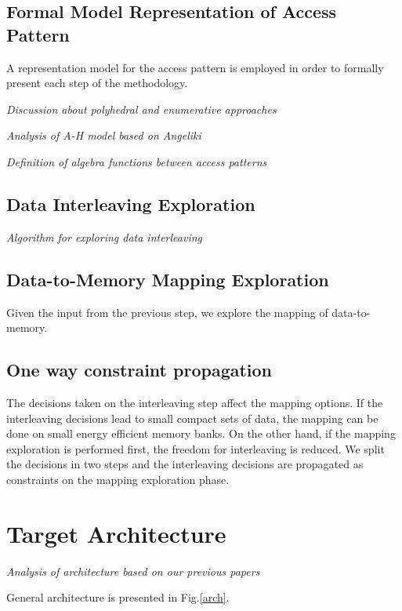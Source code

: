\documentclass[prodmode,acmtodaes]{acmsmall}
\begin{document}
\subsection{Formal Model Representation of Access Pattern }

A representation model for the access pattern is employed in order to formally present each step of the methodology.

\textit{Discussion about polyhedral and enumerative approaches}

\textit{Analysis of A-H model based on Angeliki}

\textit{Definition of algebra functions between access patterns}

\subsection{Data Interleaving Exploration}

\textit{Algorithm for exploring data interleaving}

\subsection{Data-to-Memory Mapping Exploration}

Given the input from the previous step, we explore the mapping of data-to-memory.

\subsection{One way constraint propagation}

The decisions taken on the interleaving step affect the mapping options.
If the interleaving decisions lead to small compact sets of data, the mapping can be done on small energy efficient memory banks.
On the other hand, if the mapping exploration is performed first, the freedom for interleaving is reduced.
We split the decisions in two steps and the interleaving decisions are propagated as constraints on the mapping exploration phase. 

\section{Target Architecture}

\textit{Analysis of architecture based on our previous papers}

General architecture is presented in Fig.\ref{arch}.
\end{document}
